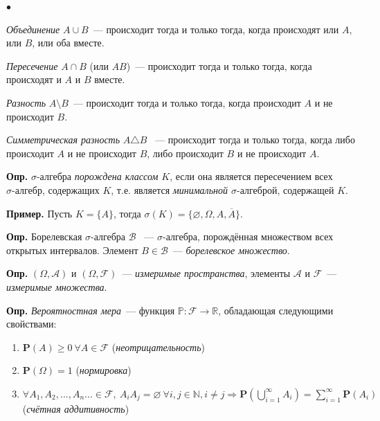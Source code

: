\documentclass[oneside,final,14pt]{extreport}
\newcommand\mydef{{\bf Опр.}}
\newcommand\myex{{\bf Пример.}}
\newcommand\myprob[1]{{\mathbf{P}(#1)}}
\theoremstyle{definition}
\newenvironment{compactlist}{
\begin{list}{{$\bullet$}}{
\setlength\partopsep{0pt}
\setlength\parskip{0pt}
\setlength\parsep{0pt}
\setlength\topsep{0pt}
\setlength\itemsep{0pt}
}
}{
\end{list}
}
\begin{document}
\begin{compactlist}
    \item {\it Объединение} \(A \cup B \)~--- происходит тогда и только тогда, когда происходят или \(A\), или \(B\), или оба вместе.
    \item {\it Пересечение} \(A \cap B \) (или \(AB \))~--- происходит тогда и только тогда, когда происходят и \(A\) и \(B\) вместе.
    \item {\it Разность} \(A \setminus B \)~--- происходит тогда и только тогда, когда происходит \(A\) и не происходит \(B\).
    \item {\it Симметрическая разность} \(A \triangle B \) ~--- происходит тогда и только тогда, когда либо происходит \(A\) и не происходит \(B\), либо происходит \(B\) и не происходит \(A\).
\end{compactlist}

\mydef{} \( \sigma \text{-алгебра} \) {\it порождена классом \(K\)}, если она является пересечением всех \( \sigma \text{-алгебр}\), содержащих \(K\), т.е. является {\it минимальной \( \sigma \text{-алгеброй} \)}, содержащей \(K\).

\myex{} Пусть \( K = \{A\} \), тогда \( \sigma (K) = \{\varnothing, \Omega, A, \overline{A}\} \).

\mydef{} {\it \( \text{Борелевская~} \sigma \text{-алгебра~} \mathcal{B} \) }~--- \( \sigma \text{-алгебра}\), порождённая множеством всех открытых интервалов. Элемент \(B \in \mathcal{B}\)~--- {\it борелевское множество}.

\mydef{} \( (\Omega, \mathcal{A}) \) и \( (\Omega, \mathcal{F}) \)~--- {\it измеримые пространства}, элементы \(\mathcal{A}\) и \(\mathcal{F}\)~---{\it измеримые множества}.

\mydef{} {\it Вероятностная мера}~--- функция \( \mathbb{P}: \mathcal{F} \rightarrow \mathbb{R} \), обладающая следующими свойствами:

\begin{enumerate}
    \item \( \myprob{A} \geqslant 0~\forall A \in \mathcal{F} \) ({\it неотрицательность})
    \item \( \myprob{\Omega} = 1 \) ({\it нормировка})
    \item \( \forall A_1, A_2, ..., A_n... \in \mathcal{F},~ A_{i}A_{j} = \varnothing~ \forall i, j \in \mathbb{N}, i \ne j \Rightarrow \myprob{\bigcup\limits_{i=1}^\infty A_i} = \sum\limits_{i=1}^\infty \myprob{A_i} \) ({\it счётная аддитивность})
\end{enumerate}
\end{document}
